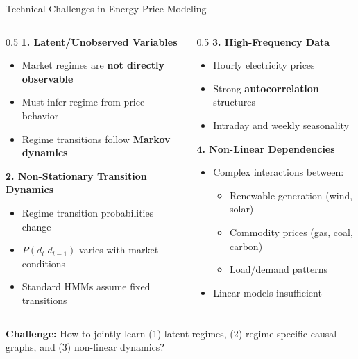 \documentclass[aspectratio=169]{beamer}
\begin{document}
\begin{frame}{Technical Challenges in Energy Price Modeling}
\begin{columns}
\begin{column}{0.5\textwidth}
\textbf{1. Latent/Unobserved Variables}
\begin{itemize}
    \item Market regimes are \textbf{not directly observable}
    \item Must infer regime from price behavior
    \item Regime transitions follow \textbf{Markov dynamics}
\end{itemize}

\vspace{0.3cm}
\textbf{2. Non-Stationary Transition Dynamics}
\begin{itemize}
    \item Regime transition probabilities change
    \item $P(d_t | d_{t-1})$ varies with market conditions
    \item Standard HMMs assume fixed transitions
\end{itemize}
\end{column}

\begin{column}{0.5\textwidth}
\textbf{3. High-Frequency Data}
\begin{itemize}
    \item Hourly electricity prices
    \item Strong \textbf{autocorrelation} structures
    \item Intraday and weekly seasonality
\end{itemize}

\vspace{0.3cm}
\textbf{4. Non-Linear Dependencies}
\begin{itemize}
    \item Complex interactions between:
    \begin{itemize}
        \item Renewable generation (wind, solar)
        \item Commodity prices (gas, coal, carbon)
        \item Load/demand patterns
    \end{itemize}
    \item Linear models insufficient
\end{itemize}
\end{column}
\end{columns}

\vspace{0.3cm}
\begin{center}
\textcolor{warnred}{\textbf{Challenge:}} How to jointly learn (1) latent regimes, (2) regime-specific causal graphs, and (3) non-linear dynamics?
\end{center}
\end{frame}
\end{document}
